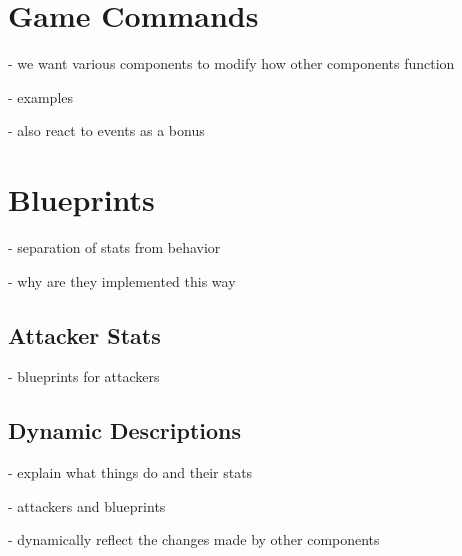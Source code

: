 \section{Game Commands}

- we want various components to modify how other components function

- examples

- also react to events as a bonus

\section{Blueprints}

- separation of stats from behavior

- why are they implemented this way

\subsection{Attacker Stats}

- blueprints for attackers

\subsection{Dynamic Descriptions}

- explain what things do and their stats

- attackers and blueprints

- dynamically reflect the changes made by other components

